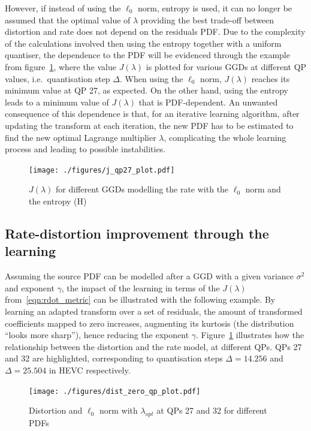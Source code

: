 \documentclass[11pt,a4paper,openright,twoside]{book}
\numberwithin{equation}{section} %
\numberwithin{figure}{section} %
\numberwithin{table}{section} %
\begin{document}
However, if instead of using the $\ell_0$ norm, entropy is used, it can
no longer be assumed that the optimal value of $\lambda$ providing the
best trade-off between distortion and rate does not depend on the
residuals \ac{PDF}.
Due to the complexity of the calculations involved then using the
entropy together with a uniform quantiser, the dependence to the
\ac{PDF} will be evidenced through the example from
figure~\ref{fig:j_lambda_qp}, where the value $J(\lambda)$ is plotted
for various \acp{GGD} at different \ac{QP} values, i.e.\ quantisation
step $\Delta$.
When using the $\ell_0$ norm, $J(\lambda)$ reaches its minimum value at
QP 27, as expected.
On the other hand, using the entropy leads to a minimum value of
$J(\lambda)$ that is \ac{PDF}-dependent.
An unwanted consequence of this dependence is that, for an iterative
learning algorithm, after updating the transform at each iteration, the
new \ac{PDF} has to be estimated to find the new optimal Lagrange
multiplier $\lambda$, complicating the whole learning process and
leading to possible instabilities.
\begin{figure}[tp]
	\centering
	\texttt{[image: ./figures/j\_qp27\_plot.pdf]}
	\caption{$J(\lambda)$ for different \acp{GGD} modelling the rate with
	the $\ell_0$ norm and the entropy (H)}
	\label{fig:j_lambda_qp}
\end{figure}

\subsection{Rate-distortion improvement through the learning}
\label{sub:rate_distortion_improvement_through_the_learning}

Assuming the source \ac{PDF} can be modelled after a \ac{GGD} with a
given variance $\sigma^2$ and exponent $\gamma$, the impact of the
learning in terms of the $J(\lambda)$ from~\eqref{eqn:rdot_metric} can
be illustrated with the following example.
By learning an adapted transform over a set of residuals, the amount of
transformed coefficients mapped to zero increases, augmenting its
kurtosis (the distribution ``looks more sharp''), hence reducing the
exponent $\gamma$.
Figure~\ref{fig:j_lambda_qp} illustrates how the relationship between
the distortion and the rate model, at different \acp{QP}.
\acp{QP} 27 and 32 are highlighted, corresponding to quantisation steps
$\Delta = 14.256$ and $\Delta = 25.504$ in \ac{HEVC} respectively.

\begin{figure}[tp]
	\centering
	\texttt{[image: ./figures/dist\_zero\_qp\_plot.pdf]}
	\caption{Distortion and $\ell_0$ norm with $\lambda_{opt}$ at
	\acsp{QP} 27 and 32 for different \acsp{PDF}}
	\label{fig:lambda_zero_norm_dist}
\end{figure}
\end{document}
